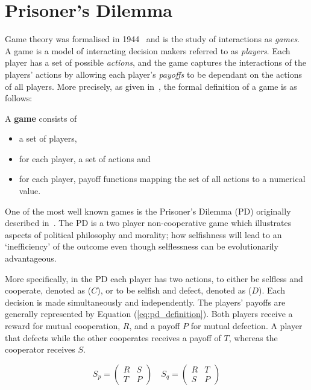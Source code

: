 \section{Prisoner's Dilemma}\label{section:introduction_prisoners_dilemma}

Game theory was formalised in 1944~\cite{VonNeumann1944} and is the study of
interactions as \textit{games}. A game is a model of interacting
decision makers referred to as \textit{players}. Each player has a set of
possible \textit{actions}, and the game captures the interactions of the players'
actions by allowing each player's \textit{payoffs} to be dependant on the actions
of all players. More precisely, as given in~\cite{Osborne2004}, the formal
definition of a game is as follows:

\begin{definition}
A \textbf{game} consists of
\begin{itemize}
    \item a set of players,
    \item for each player, a set of actions and
    \item for each player, payoff functions mapping the set of all actions to a numerical value.
\end{itemize}
\end{definition}

One of the most well known games is the Prisoner's Dilemma (PD) originally
described in~\cite{Flood1958}. The PD is a two player non-cooperative game which
illustrates aspects of political philosophy and morality; how selfishness will
lead to an `inefficiency' of the outcome even though selflessness can be
evolutionarily advantageous.

More specifically, in the PD each player has two actions, to either be selfless
and cooperate, denoted as ($C$), or to be selfish and defect, denoted as ($D$). Each
decision is made simultaneously and independently. The players' payoffs are
generally represented by Equation (\ref{eq:pd_definition}). Both players receive a reward
for mutual cooperation, \(R\), and a payoff \(P\) for mutual defection. A player
that defects while the other cooperates receives a payoff of \(T\), whereas the
cooperator receives \(S\).

\begin{equation}\label{eq:pd_definition}
    S_p =
    \begin{pmatrix}
        R & S  \\
        T & P
    \end{pmatrix}
    \quad
    S_q =
    \begin{pmatrix}
        R & T  \\
        S & P
    \end{pmatrix}
\end{equation}

